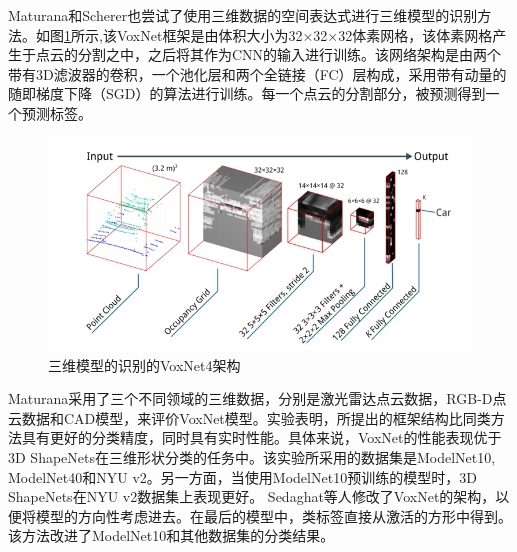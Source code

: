 \documentclass[twoside,UTF8]{nputhesis}
\begin{document}
Maturana和Scherer\cite{Maturana2015VoxNet}也尝试了使用三维数据的空间表达式进行三维模型的识别方法。如图\ref{fig_Maturana}所示,该VoxNet框架是由体积大小为32×32×32体素网格，该体素网格产生于点云的分割之中，之后将其作为CNN的输入进行训练。该网络架构是由两个带有3D滤波器的卷积，一个池化层和两个全链接（FC）层构成，采用带有动量的随即梯度下降（SGD）的算法进行训练。每一个点云的分割部分，被预测得到一个预测标签。
\begin{figure}[tb]
\begin{center}
\includegraphics[width=0.9\linewidth]{figures/Maturana.jpg} 
\end{center} 
\vspace{-4mm}
\caption{三维模型的识别的VoxNet4架构} 
\label{fig_Maturana}
\end{figure}
Maturana采用了三个不同领域的三维数据，分别是激光雷达点云数据，RGB-D点云数据和CAD模型，来评价VoxNet模型。实验表明，所提出的框架结构比同类方法具有更好的分类精度，同时具有实时性能。具体来说，VoxNet的性能表现优于3D ShapeNets\cite{Wu20143D}在三维形状分类的任务中。该实验所采用的数据集是ModelNet10, ModelNet40和NYU v2\cite{Silberman2012Indoor}。另一方面，当使用ModelNet10预训练的模型时，3D ShapeNets在NYU v2数据集上表现更好。 Sedaghat等人\cite{Sedaghat2016Orientation}修改了VoxNet的架构，以便将模型的方向性考虑进去。在最后的模型中，类标签直接从激活的方形中得到。 该方法改进了ModelNet10和其他数据集的分类结果。
\end{document}
